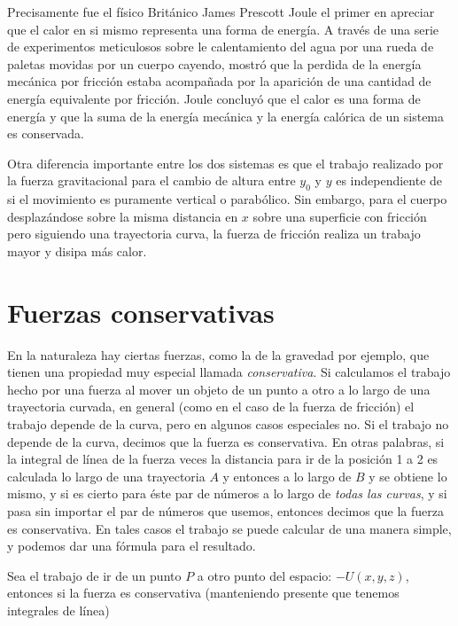 Precisamente fue el físico Británico James Prescott Joule el primer en
apreciar que el calor en si mismo representa una forma de energía. A
través de una serie de experimentos meticulosos sobre le calentamiento
del agua por una rueda de paletas movidas por un cuerpo cayendo,
mostró que la perdida de la energía mecánica por fricción estaba
acompañada por la aparición de una cantidad de energía equivalente por
fricción. Joule concluyó que el calor es una forma de energía y que la
suma de la energía mecánica y la energía calórica de un sistema es
conservada.

Otra diferencia importante entre los dos sistemas es que el trabajo
realizado por la fuerza gravitacional para el cambio de altura entre
$y_0$ y $y$ es independiente de si el movimiento es puramente vertical
o parabólico. Sin embargo, para el cuerpo desplazándose sobre la misma
distancia en $x$ sobre una superficie con fricción pero siguiendo una
trayectoria curva, la fuerza de fricción realiza un trabajo mayor y
disipa más calor.





\section{Fuerzas conservativas}
En la naturaleza hay ciertas fuerzas, como la de la gravedad por
ejemplo, que tienen una propiedad muy especial llamada
\emph{conservativa}. Si calculamos el trabajo hecho por una fuerza al
mover un objeto de un punto a otro a lo largo de una trayectoria
curvada, en general (como en el caso de la fuerza de fricción) el
trabajo depende de la curva, pero en algunos casos especiales no. Si
el trabajo no depende de la curva, decimos que la fuerza es
conservativa. En otras palabras, si la integral de línea de la fuerza
veces la distancia para ir de la posición 1 a 2 es calculada lo largo
de una trayectoria $A$ y entonces a lo largo de $B$ y se obtiene lo
mismo, y si es cierto para éste par de números a lo largo de
\emph{todas las curvas}, y si pasa sin importar el par de números que
usemos, entonces decimos que la fuerza es conservativa. En tales casos
el trabajo se puede calcular de una manera simple, y podemos dar una
fórmula para el resultado.

Sea el trabajo de ir de un punto $P$ a otro punto del espacio: $-U(x,y,z)$, entonces si la fuerza es conservativa (manteniendo presente que tenemos integrales de línea)

